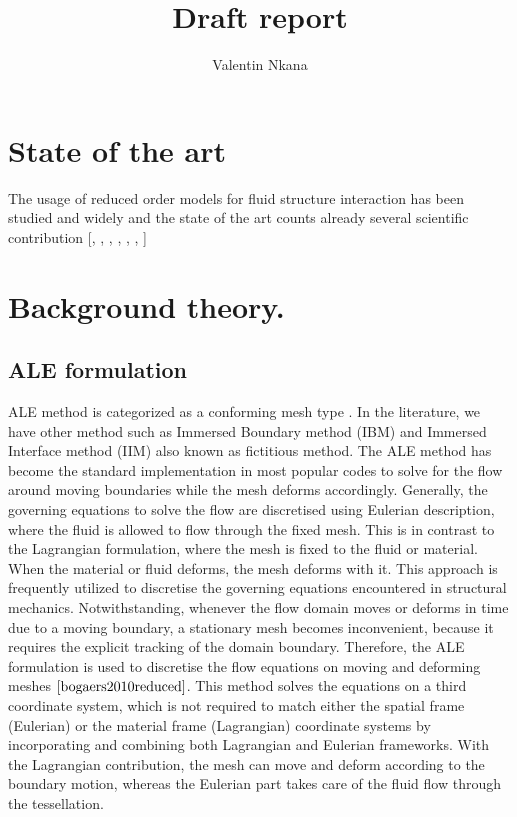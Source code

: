 \documentclass[10pt,a4paper,twoside]{article}
\author{Valentin Nkana}
\title{Draft report}
\begin{document}
	
\maketitle
\section{State of the art}

The usage of reduced order models for fluid structure interaction has been studied and widely and the state of the art counts already several scientific contribution [\cite{bogaers2010reduced}, \cite{shinde2019galerkin}, \cite{shinde2016modelling}, \cite{ballarin2016pod}, \cite{liberge2010reduced}, \cite{liberge2008reduction},\cite{tello2020fluid} ]	
	
\section{Background theory.}
\subsection{ALE formulation}
ALE method is categorized as a conforming mesh type \cite{morab2020overview}. In the literature, we have other method such as Immersed Boundary method (IBM) and Immersed Interface method (IIM) also known as fictitious method.
The ALE method has become the standard implementation in most popular codes to
solve for the flow around moving boundaries while the mesh deforms accordingly. Generally, the governing equations to solve the flow are discretised using Eulerian description, where the fluid is allowed to flow through the fixed mesh. This is in  contrast to the Lagrangian formulation, where the mesh is fixed to the fluid or material. When the material or fluid deforms, the mesh deforms with it. This approach is frequently utilized to discretise the governing equations encountered in structural mechanics. Notwithstanding, whenever the flow domain moves or deforms in time due to a moving boundary, a stationary mesh becomes inconvenient, because it requires the explicit tracking of the domain boundary. Therefore, the ALE formulation is used to discretise the flow equations on moving and deforming meshes $\cite{bogaers2010reduced}$. This method solves the equations on a third
coordinate system, which is not required to match either the spatial frame (Eulerian) or the material frame (Lagrangian)
 coordinate systems by incorporating and combining both Lagrangian and Eulerian frameworks. With the Lagrangian contribution, the mesh can move and deform according to the boundary motion, whereas the Eulerian part takes care of the fluid flow through the tessellation.
\end{document}
